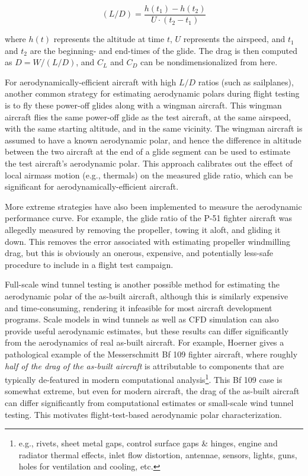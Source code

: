 \documentclass[conf]{new-aiaa}
\begin{document}
    $$(L/D) = \frac{h(t_1) - h(t_2)}{U \cdot (t_2 - t_1)}$$

    where $h(t)$ represents the altitude at time $t$, $U$ represents the airspeed, and $t_1$ and $t_2$ are the beginning- and end-times of the glide. The drag is then computed as $D = W / (L/D)$, and $C_L$ and $C_D$ can be nondimensionalized from here.

    For aerodynamically-efficient aircraft with high $L/D$ ratios (such as sailplanes), another common strategy for estimating aerodynamic polars during flight testing is to fly these power-off glides along with a wingman aircraft. This wingman aircraft flies the same power-off glide as the test aircraft, at the same airspeed, with the same starting altitude, and in the same vicinity. The wingman aircraft is assumed to have a known aerodynamic polar, and hence the difference in altitude between the two aircraft at the end of a glide segment can be used to estimate the test aircraft's aerodynamic polar. This approach calibrates out the effect of local airmass motion (e.g., thermals) on the measured glide ratio, which can be significant for aerodynamically-efficient aircraft.

    More extreme strategies have also been implemented to measure the aerodynamic performance curve. For example, the glide ratio of the P-51 fighter aircraft was allegedly measured by removing the propeller, towing it aloft, and gliding it down. This removes the error associated with estimating propeller windmilling drag, but this is obviously an onerous, expensive, and potentially less-safe procedure to include in a flight test campaign.

    Full-scale wind tunnel testing is another possible method for estimating the aerodynamic polar of the as-built aircraft, although this is similarly expensive and time-consuming, rendering it infeasible for most aircraft development programs. Scale models in wind tunnels as well as CFD simulation can also provide useful aerodynamic estimates, but these results can differ significantly from the aerodynamics of real as-built aircraft. For example, Hoerner \cite{hoerner_fluiddynamic_1965} gives a pathological example of the Messerschmitt Bf 109 fighter aircraft, where roughly \emph{half of the drag of the as-built aircraft} is attributable to components that are typically de-featured in modern computational analysis\footnote{e.g., rivets, sheet metal gaps, control surface gaps \& hinges, engine and radiator thermal effects, inlet flow distortion, antennae, sensors, lights, guns, holes for ventilation and cooling, etc.}. This Bf 109 case is somewhat extreme, but even for modern aircraft, the drag of the as-built aircraft can differ significantly from computational estimates or small-scale wind tunnel testing. This motivates flight-test-based aerodynamic polar characterization.
\end{document}
